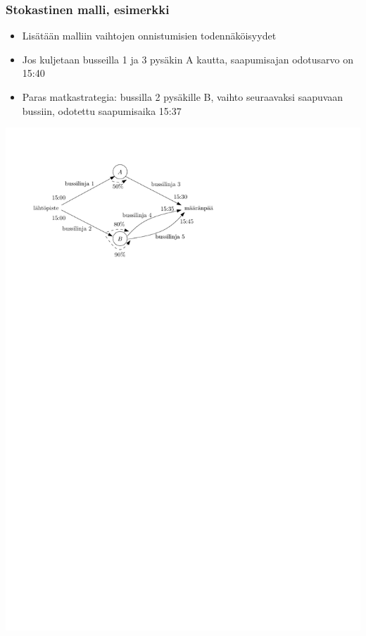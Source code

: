 \documentclass{beamer}
\begin{document}
\begin{frame}
  \frametitle{Stokastinen malli, esimerkki} 
  \begin{minipage}[t][0.3\textheight][t]{\textwidth}
  \begin{itemize}
   \item 
Lisätään malliin vaihtojen onnistumisien todennäköisyydet 
\item
Jos kuljetaan busseilla 1 ja 3 pysäkin A kautta, saapumisajan odotusarvo on 15:40
\item
Paras matkastrategia: bussilla 2 pysäkille B, vaihto seuraavaksi saapuvaan bussiin, odotettu saapumisaika 15:37
   \end{itemize}
   \end{minipage}
   \vfill
     \begin{minipage}{\textwidth}
     \begin{center}
     \includegraphics[scale=0.6]{matkansuunnittelu02}
      \end{center}
      \end{minipage}
\end{frame} 
\end{document}
